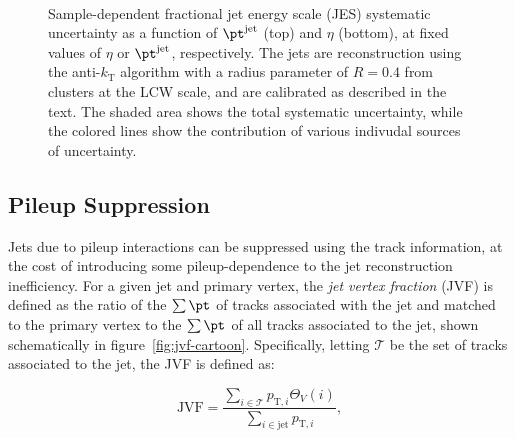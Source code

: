 \begin{figure}[htbp]
{	}
	\hfill
	 \\
	\caption{Sample-dependent fractional jet energy scale (JES) systematic uncertainty as a function of $\pt^{\mathrm{jet}}$ (top) and $\eta$ (bottom), at fixed values of $\eta$ or $\pt^{\mathrm{jet}}$, respectively. The jets are reconstruction using the anti-$k_{\mathrm{T}}$ algorithm with a radius parameter of $R=0.4$ from clusters at the LCW scale, and are calibrated as described in the text. The shaded area shows the total systematic uncertainty, while the colored lines show the contribution of various indivudal sources of uncertainty.}
	\label{fig:reco-jes-uncertainty}
\end{figure}

\subsection{Pileup Suppression}\label{sec:reco-jets-jvf}
Jets due to pileup interactions can be suppressed using the track information, at the cost of introducing some pileup-dependence to the jet reconstruction inefficiency. For a given jet and primary vertex, the \emph{jet vertex fraction} (JVF) is defined as the ratio of the $\sum \pt$ of tracks associated with the jet and matched to the primary vertex to the $\sum\pt$ of all tracks associated to the jet, shown schematically in figure~\ref{fig:jvf-cartoon}. Specifically, letting $\mathcal{T}$ be the set of tracks associated to the jet, the JVF is defined as:

\begin{equation}\label{eqn:jvf}
	\mathrm{JVF}=\frac{\sum_{i\in\mathcal{T}} p_{\mathrm{T},i} \Theta_V(i)} {\sum_{i\in\mathrm{jet}} p_{\mathrm{T},i} },
\end{equation}

